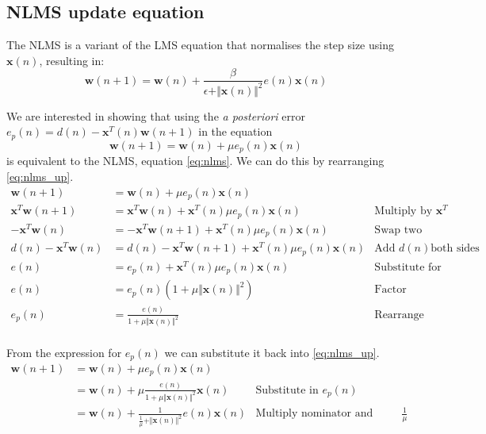 \documentclass[10pt,twoside,a4paper]{report}
\begin{document}
\subsection{NLMS update equation}

The NLMS is a variant of the LMS equation that normalises the step size using $\mathbf{x}(n)$, resulting in:
\begin{equation}
\mathbf{w}(n+1) = \mathbf{w}(n) + \frac{\beta}{\epsilon+\Vert \mathbf{x}(n)\Vert^2}e(n)\mathbf{x}(n)
\label{eq:nlms}
\end{equation}

We are interested in showing that using the \textit{a posteriori} error $e_p(n)=d(n)-\mathbf{x}^T(n)\mathbf{w}(n+1)$ in the equation 
\begin{equation}
\mathbf{w}(n+1) = \mathbf{w}(n) + \mu e_p(n)\mathbf{x}(n)
\label{eq:nlms_up}
\end{equation}
is equivalent to the NLMS, equation \ref{eq:nlms}. We can do this by rearranging \ref{eq:nlms_up}.
\begin{align*}
\mathbf{w}(n+1) &= \mathbf{w}(n) + \mu e_p(n)\mathbf{x}(n)& \\
\mathbf{x}^T\mathbf{w}(n+1) &= \mathbf{x}^T\mathbf{w}(n) + \mathbf{x}^T(n)\mu e_p(n)\mathbf{x}(n)& \text{Multiply by }\mathbf{x}^T\\
-\mathbf{x}^T\mathbf{w}(n) &= -\mathbf{x}^T\mathbf{w}(n+1) + \mathbf{x}^T(n)\mu e_p(n)\mathbf{x}(n)& \text{Swap two leading terms}\\
d(n)-\mathbf{x}^T\mathbf{w}(n) &= d(n)-\mathbf{x}^T\mathbf{w}(n+1) + \mathbf{x}^T(n)\mu e_p(n)\mathbf{x}(n)& \text{Add }d(n)\text{both sides}\\
e(n) &= e_p(n) + \mathbf{x}^T(n)\mu e_p(n)\mathbf{x}(n)& \text{Substitute for error terms}\\
e(n) &= e_p(n)\left(1 + \mu \Vert \mathbf{x}(n)\Vert^2\right)& \text{Factor}\\
e_p(n) &= \frac{e(n)}{1 + \mu \Vert \mathbf{x}(n)\Vert^2}  & \text{Rearrange}\\
\end{align*}

From the expression for $e_p(n)$ we can substitute it back into \ref{eq:nlms_up}.
 \begin{align*}
 \mathbf{w}(n+1) &= \mathbf{w}(n) + \mu e_p(n)\mathbf{x}(n) & \\
   &= \mathbf{w}(n) + \mu \frac{e(n)}{1 + \mu \Vert \mathbf{x}(n)\Vert^2}\mathbf{x}(n) & \text{Substitute in }e_p(n)\\
 &= \mathbf{w}(n) +  \frac{1}{\frac{1}{\mu} + \Vert \mathbf{x}(n)\Vert^2}e(n)\mathbf{x}(n) & \text{Multiply nominator and denominator by }\frac{1}{\mu}\\
 \end{align*}
 
\end{document}

